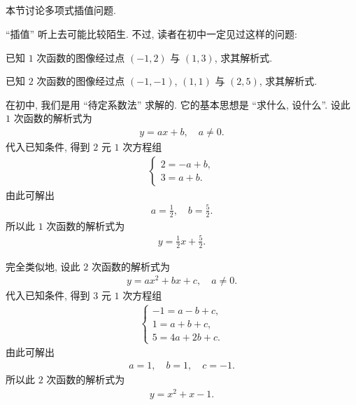 \subsection*{\Interpolation}
\markright{\Interpolation}

本节讨论多项式插值问题.

``插值'' 听上去可能比较陌生. 不过, 读者在初中一定见过这样的问题:

\begin{example}
    已知 $1$ 次函数的图像经过点 $(-1,2)$ 与 $(1,3)$, 求其解析式.
\end{example}

\begin{example}
    已知 $2$ 次函数的图像经过点 $(-1,-1)$, $(1,1)$ 与 $(2,5)$, 求其解析式.
\end{example}

在初中, 我们是用 ``待定系数法''  求解的. 它的基本思想是 ``求什么, 设什么''. 设此 $1$ 次函数的解析式为
\begin{align*}
    y = ax + b, \quad a \neq 0.
\end{align*}
代入已知条件, 得到 $2$ 元 $1$ 次方程组
\begin{align*}
    \begin{cases}
        2 = -a + b, \\
        3 = a + b.
    \end{cases}
\end{align*}
由此可解出
\begin{align*}
    a = \frac12, \quad b = \frac52.
\end{align*}
所以此 $1$ 次函数的解析式为
\begin{align*}
    y = \frac12 x + \frac52.
\end{align*}

完全类似地, 设此 $2$ 次函数的解析式为
\begin{align*}
    y = ax^2 + bx + c, \quad a \neq 0.
\end{align*}
代入已知条件, 得到 $3$ 元 $1$ 次方程组
\begin{align*}
    \begin{cases}
        -1 = a - b + c, \\
        1 = a + b + c,  \\
        5 = 4a + 2b + c.
    \end{cases}
\end{align*}
由此可解出
\begin{align*}
    a = 1, \quad b = 1, \quad c = -1.
\end{align*}
所以此 $2$ 次函数的解析式为
\begin{align*}
    y = x^2 + x - 1.
\end{align*}

